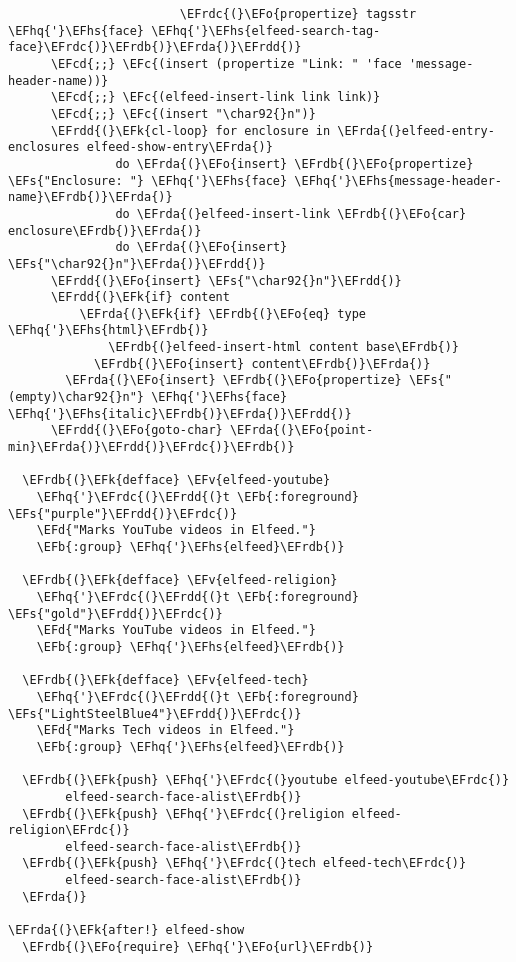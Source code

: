 \documentclass[a4wide,10pt]{article}
\newcommand{\EFc}[1]{\textcolor{EFc}{#1}} %
\newcommand{\EFcd}[1]{\textcolor{EFcd}{#1}} %
\newcommand{\EFs}[1]{\textcolor{EFs}{#1}} %
\newcommand{\EFd}[1]{\textcolor{EFd}{#1}} %
\newcommand{\EFk}[1]{\textcolor{EFk}{#1}} %
\newcommand{\EFb}[1]{\textcolor{EFb}{#1}} %
\newcommand{\EFv}[1]{\textcolor{EFv}{#1}} %
\newcommand{\EFo}[1]{\textcolor{EFo}{#1}} %
\newcommand{\EFhq}[1]{\textcolor{EFhq}{#1}} %
\newcommand{\EFhs}[1]{\textcolor{EFhs}{#1}} %
\newcommand{\EFrda}[1]{\textcolor{EFrda}{#1}} %
\newcommand{\EFrdb}[1]{\textcolor{EFrdb}{#1}} %
\newcommand{\EFrdc}[1]{\textcolor{EFrdc}{#1}} %
\newcommand{\EFrdd}[1]{\textcolor{EFrdd}{#1}} %
\begin{document}
\begin{Code}
\begin{Verbatim}
                        \EFrdc{(}\EFo{propertize} tagsstr \EFhq{'}\EFhs{face} \EFhq{'}\EFhs{elfeed-search-tag-face}\EFrdc{)}\EFrdb{)}\EFrda{)}\EFrdd{)}
      \EFcd{;;} \EFc{(insert (propertize "Link: " 'face 'message-header-name))}
      \EFcd{;;} \EFc{(elfeed-insert-link link link)}
      \EFcd{;;} \EFc{(insert "\char92{}n")}
      \EFrdd{(}\EFk{cl-loop} for enclosure in \EFrda{(}elfeed-entry-enclosures elfeed-show-entry\EFrda{)}
               do \EFrda{(}\EFo{insert} \EFrdb{(}\EFo{propertize} \EFs{"Enclosure: "} \EFhq{'}\EFhs{face} \EFhq{'}\EFhs{message-header-name}\EFrdb{)}\EFrda{)}
               do \EFrda{(}elfeed-insert-link \EFrdb{(}\EFo{car} enclosure\EFrdb{)}\EFrda{)}
               do \EFrda{(}\EFo{insert} \EFs{"\char92{}n"}\EFrda{)}\EFrdd{)}
      \EFrdd{(}\EFo{insert} \EFs{"\char92{}n"}\EFrdd{)}
      \EFrdd{(}\EFk{if} content
          \EFrda{(}\EFk{if} \EFrdb{(}\EFo{eq} type \EFhq{'}\EFhs{html}\EFrdb{)}
              \EFrdb{(}elfeed-insert-html content base\EFrdb{)}
            \EFrdb{(}\EFo{insert} content\EFrdb{)}\EFrda{)}
        \EFrda{(}\EFo{insert} \EFrdb{(}\EFo{propertize} \EFs{"(empty)\char92{}n"} \EFhq{'}\EFhs{face} \EFhq{'}\EFhs{italic}\EFrdb{)}\EFrda{)}\EFrdd{)}
      \EFrdd{(}\EFo{goto-char} \EFrda{(}\EFo{point-min}\EFrda{)}\EFrdd{)}\EFrdc{)}\EFrdb{)}

  \EFrdb{(}\EFk{defface} \EFv{elfeed-youtube}
    \EFhq{'}\EFrdc{(}\EFrdd{(}t \EFb{:foreground} \EFs{"purple"}\EFrdd{)}\EFrdc{)}
    \EFd{"Marks YouTube videos in Elfeed."}
    \EFb{:group} \EFhq{'}\EFhs{elfeed}\EFrdb{)}

  \EFrdb{(}\EFk{defface} \EFv{elfeed-religion}
    \EFhq{'}\EFrdc{(}\EFrdd{(}t \EFb{:foreground} \EFs{"gold"}\EFrdd{)}\EFrdc{)}
    \EFd{"Marks YouTube videos in Elfeed."}
    \EFb{:group} \EFhq{'}\EFhs{elfeed}\EFrdb{)}

  \EFrdb{(}\EFk{defface} \EFv{elfeed-tech}
    \EFhq{'}\EFrdc{(}\EFrdd{(}t \EFb{:foreground} \EFs{"LightSteelBlue4"}\EFrdd{)}\EFrdc{)}
    \EFd{"Marks Tech videos in Elfeed."}
    \EFb{:group} \EFhq{'}\EFhs{elfeed}\EFrdb{)}

  \EFrdb{(}\EFk{push} \EFhq{'}\EFrdc{(}youtube elfeed-youtube\EFrdc{)}
        elfeed-search-face-alist\EFrdb{)}
  \EFrdb{(}\EFk{push} \EFhq{'}\EFrdc{(}religion elfeed-religion\EFrdc{)}
        elfeed-search-face-alist\EFrdb{)}
  \EFrdb{(}\EFk{push} \EFhq{'}\EFrdc{(}tech elfeed-tech\EFrdc{)}
        elfeed-search-face-alist\EFrdb{)}
  \EFrda{)}

\EFrda{(}\EFk{after!} elfeed-show
  \EFrdb{(}\EFo{require} \EFhq{'}\EFo{url}\EFrdb{)}


\end{Verbatim}
\end{Code}
\end{document}
